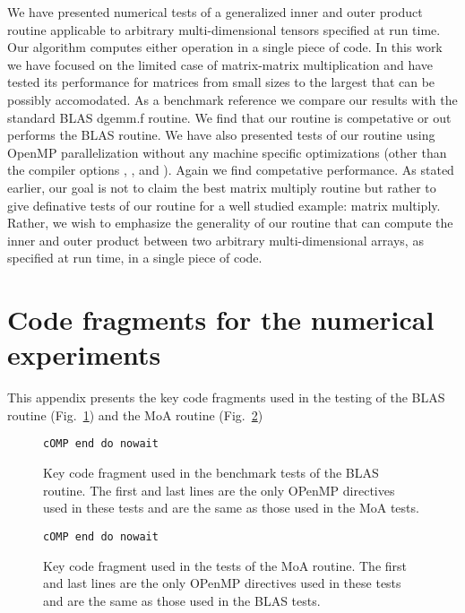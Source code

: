 \documentclass[aps,prl,twocolumn,groupedaddress,floatfix]{revtex4}
\begin{document}
We have presented numerical tests of a generalized inner and outer 
product routine applicable to arbitrary multi-dimensional tensors specified
at run time. Our algorithm computes either operation in a single piece of 
code.  In this work we have focused on the limited case of matrix-matrix
multiplication and have tested its performance for matrices from small sizes
to the largest that can be possibly accomodated.  As a benchmark reference
we compare our results with the standard BLAS dgemm.f routine.  We find 
that our routine is competative or out performs the BLAS routine.  We have
also presented tests of our routine using OpenMP parallelization without
any machine specific optimizations (other than the compiler options ,
,  and ).  Again we find competative performance.  As stated
earlier, our goal is not to claim the best matrix multiply routine but rather
to give definative tests of our routine for a well studied example: matrix
multiply.  Rather, we wish to emphasize the generality of our routine that
can compute the inner and outer product between two arbitrary multi-dimensional
arrays, as specified at run time, in a single piece of code.










\appendix
\section{Code fragments for the numerical experiments}

This appendix presents the key code fragments used in the testing of 
the BLAS routine (Fig.~\ref{blas_code}) and the MoA routine 
(Fig.~\ref{moa_code}) 

\begin{figure}
\begin{verbatim}
cOMP end do nowait

\end{verbatim}
\caption{
\label{blas_code}
Key code fragment used in the benchmark tests of the BLAS routine.  The
first and last lines are the only OPenMP directives used in these tests
and are the same as those used in the MoA tests.
}
\end{figure}

\begin{figure}
\begin{verbatim}
cOMP end do nowait

\end{verbatim}
\caption{
\label{moa_code}
Key code fragment used in the tests of the MoA routine.  The
first and last lines are the only OPenMP directives used in these tests and
are the same as those used in the BLAS tests.
}
\end{figure}





\end{document}
